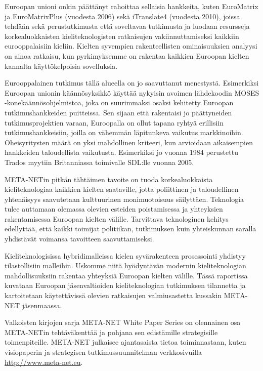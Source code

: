 \documentclass{../../metanetpaper}
\begin{document}
\begin{Parallel}[c]{79mm}{78mm}
{Euroopan unioni onkin päättänyt rahoittaa sellaisia hankkeita, kuten EuroMatrix
ja EuroMatrixPlus (vuodesta 2006) sekä iTranslate4 (vuodesta 2010), joissa
tehdään sekä perustutkimusta että soveltavaa tutkimusta ja luodaan resursseja
korkealuokkaisten kieliteknologisten ratkaisujen vakiinnuttamiseksi kaikkiin
eurooppalaisiin kieliin. Kielten syvempien rakenteellisten ominaisuuksien
analyysi on ainoa ratkaisu, kun pyrkimyksemme on rakentaa kaikkien Euroopan
kielten kannalta käyttökelpoisia sovelluksia.

Eurooppalainen tutkimus tällä alueella on jo saavuttanut menestystä.
Esimerkiksi Euroopan unionin käännösyksikkö käyttää nykyisin avoimen
lähdekoodin MOSES -konekäännösohjelmistoa, joka on suurimmaksi osaksi kehitetty
Euroopan tutkimushankkeiden puitteissa. Sen sijaan että rakentaisi jo
päättyneiden tutkimusprojektien varaan, Euroopalla on ollut tapana ryhtyä
erillisiin tutkimushankkeisiin, joilla on vähemmän läpitunkeva vaikutus
markkinoihin. Oheisyritysten määrä on yksi mahdollinen kriteeri, kun arvioidaan
aikaisempien hankkeiden taloudellista vaikutusta. Esimerkiksi jo vuonna 1984
perustettu Trados myytiin Britanniassa toimivalle SDL:lle vuonna 2005.


META-NETin pitkän tähtäimen tavoite on tuoda korkealuokkaista
kieliteknologiaa kaikkien kielten saataville, jotta poliittinen ja 
taloudellinen yhtenäisyys saavutetaan kulttuurinen monimuotoisuus
säilyttäen. Teknologia tulee auttamaan olemassa olevien esteiden
poistamisessa ja yhteyksien rakentamisessa Euroopan kielten
välille. Tarvittava teknologinen kehitys edellyttää, että kaikki
toimijat politiikan, tutkimuksen kuin yhteiskunnan saralla yhdistävät
voimansa tavoitteen saavuttamiseksi.

Kieliteknologisissa hybridimalleissa kielen syvärakenteen prosessointi
yhdistyy tilastollisiin malleihin. Uskomme niitä hyödyntävän modernin
kieliteknologian mahdollisuuksiin rakentaa yhteyksiä Euroopan kielten
välille. Tässä raportissa kuvataan Euroopan jäsenvaltioiden
kieliteknologian tutkimuksen tilannetta ja kartoitetaan käytettävissä
olevien ratkaisujen valmiusastetta kussakin META-NET jäsenmaassa.

Valkoisten kirjojen sarja META-NET White Paper Series on olennainen
osa META-NETin tehtäväkenttää ja pohjana sen edistämille strategisille
toimenpiteille. META-NET julkaisee ajantasaista tietoa toiminnastaan,
kuten visiopaperin \cite{Vision} ja strategisen tutkimussuunnitelman
verkkosivuilla \url{http://www.meta-net.eu}.

}
\end{Parallel}
\end{document}
